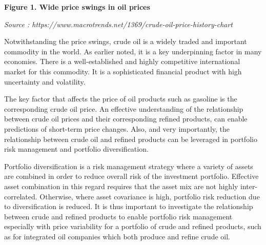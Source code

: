 \documentclass[12pt,twoside]{article}
\begin{document}

{\fontsize{11pt}{13.2pt}\selectfont \par}\par

\setlength{\parskip}{12.0pt}
\begin{Center}
{\fontsize{11pt}{13.2pt}\selectfont \textbf{Figure 1. Wide price swings in oil prices}\par}
\end{Center}\par

\begin{Center}
{\fontsize{8pt}{9.6pt}\selectfont \textit{Source : https://www.macrotrends.net/1369/crude-oil-price-history-chart}\par}
\end{Center}\par

\begin{justify}
{\fontsize{11pt}{13.2pt}\selectfont Notwithstanding the price swings, crude oil is a widely traded and important commodity in the world. As earlier noted, it is a key underpinning factor in many economies. There is a well-established and highly competitive international market for this commodity. It is a sophisticated financial product with high uncertainty and volatility.\par}
\end{justify}\par

\begin{justify}
{\fontsize{11pt}{13.2pt}\selectfont The key factor that affects the price of oil products such as gasoline is the corresponding crude oil price. An effective understanding of the relationship between crude oil prices and their corresponding refined products, can enable predictions of short-term price changes. Also, and very importantly, the relationship between crude oil and refined products can be leveraged in portfolio risk management and portfolio diversification.\par}
\end{justify}\par

\begin{justify}
{\fontsize{11pt}{13.2pt}\selectfont Portfolio diversification is a risk management strategy where a variety of assets are combined in order to reduce overall risk of the investment portfolio. Effective asset combination in this regard requires that the asset mix are not highly inter-correlated. Otherwise, where asset covariance is high, portfolio risk reduction due to diversification is reduced. It is thus important to investigate the relationship between crude and refined products to enable portfolio risk management especially with price variability for a portfolio of crude and refined products, such as for integrated oil companies which both produce and refine crude oil.\par}
\end{justify}\par
\end{document}
